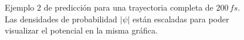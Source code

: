 \begin{figure}[H]
  \centering
  \caption{Ejemplo 2 de predicción para una trayectoria completa de $200\,fs$.\\ Las densidades de probabilidad $|\psi|$ están escaladas para poder visualizar el potencial en la misma gráfica.}
  \label{fig:trajec2}
\end{figure}

